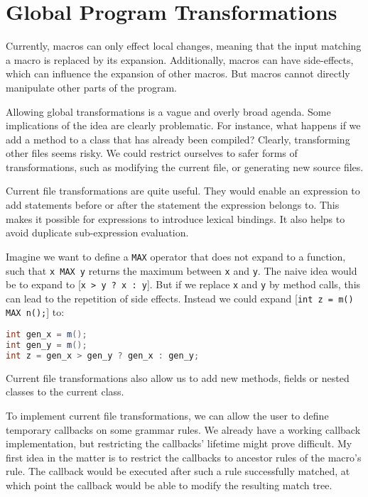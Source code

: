 \section{Global Program Transformations}
\label{global_transformations}

Currently, macros can only effect local changes, meaning that the input matching
a macro is replaced by its expansion. Additionally, macros can have
side-effects, which can influence the expansion of other macros. But macros
cannot directly manipulate other parts of the program.

Allowing global transformations is a vague and overly broad agenda. Some
implications of the idea are clearly problematic. For instance, what happens if
we add a method to a class that has already been compiled? Clearly, transforming
other files seems risky. We could restrict ourselves to safer forms of
transformations, such as modifying the current file, or generating new source
files.

Current file transformations are quite useful. They would enable an expression
to add statements before or after the statement the expression belongs to. This
makes it possible for expressions to introduce lexical bindings. It also helps
to avoid duplicate sub-expression evaluation.

Imagine we want to define a \texttt{MAX} operator that does not expand to a
function, such that \texttt{x MAX y} returns the maximum between \texttt{x} and
\texttt{y}. The naive idea would be to expand to
[\lstinline{x > y ? x : y}]. But if we replace \texttt{x} and \texttt{y} by
method calls, this can lead to the repetition of side effects. Instead we could
expand [\lstinline{int z = m() MAX n();}] to:

\begin{lstlisting}[language=Java]
int gen_x = m();
int gen_y = m();
int z = gen_x > gen_y ? gen_x : gen_y;
\end{lstlisting}

Current file transformations also allow us to add new methods, fields or nested
classes to the current class.

To implement current file transformations, we can allow the user to define
temporary callbacks on some grammar rules. We already have a working callback
implementation, but restricting the callbacks' lifetime might prove difficult.
My first idea in the matter is to restrict the callbacks to ancestor rules of
the macro's rule. The callback would be executed after such a rule successfully
matched, at which point the callback would be able to modify the resulting match
tree.

